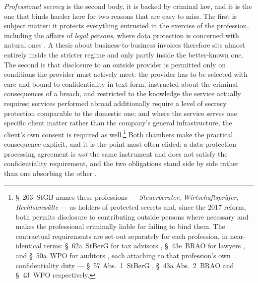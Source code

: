 \emph{Professional secrecy} is the second body, it is backed by criminal law,
and it is the one that binds harder here for two reasons that are easy to miss.
The first is subject matter: it protects everything entrusted in the exercise of
the profession, including the affairs of \emph{legal persons}, where data
protection is concerned with natural ones \parencite{bstbk2026}. A thesis about
business-to-business invoices therefore sits almost entirely inside the stricter
regime and only partly inside the better-known one. The second is that
disclosure to an outside provider is permitted only on conditions the provider
must actively meet: the provider has to be selected with care and bound to
confidentiality in text form, instructed about the criminal consequences of a
breach, and restricted to the knowledge the service actually requires;
services performed abroad additionally require a level of secrecy protection
comparable to the domestic one; and where the service serves one specific client
matter rather than the company's general infrastructure, the client's own consent is
required as well.\footnote{\S~203~\ac{StGB} \parencite{stgb203} names these
professions --- \textit{Steuerberater}, \textit{Wirtschaftspr\"ufer},
\textit{Rechtsanw\"alte} --- as holders of protected secrets and, since the 2017
reform, both permits disclosure to contributing outside persons where necessary
and makes the professional criminally liable for failing to bind them. The
contractual
requirements are set out separately for each profession, in near-identical terms:
\S~62a~\ac{StBerG} for tax advisors \parencite{stberg62a}, \S~43e~\ac{BRAO} for
lawyers \parencite{brao43e}, and \S~50a~\ac{WPO} for auditors
\parencite{wpo50a}, each attaching to that profession's own confidentiality duty
--- \S~57 Abs.~1~\ac{StBerG} \parencite{stberg57}, \S~43a Abs.~2~\ac{BRAO} and
\S~43~\ac{WPO} respectively.} Both chambers make the practical consequence explicit,
and it is the point most often elided: a data-protection processing agreement is
\emph{not} the same instrument and does not satisfy the confidentiality
requirement, and the two obligations stand side by side rather than one absorbing
the other \parencite{bstbk2026,brak2024ki,bstbkdsgvo}.

